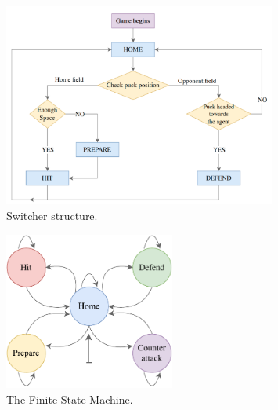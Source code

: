 \begin{figure}
    \centering
    \includegraphics[width=0.8\textwidth]{Images/switcher.pdf}
    \caption{Switcher structure.}
    \label{fig:switcher}
\end{figure}

\begin{figure}
    \centering
    \includegraphics[width=0.5\textwidth]{Images/fsm.pdf}
    \caption{The Finite State Machine.}
    \label{fig:fsm}
\end{figure}